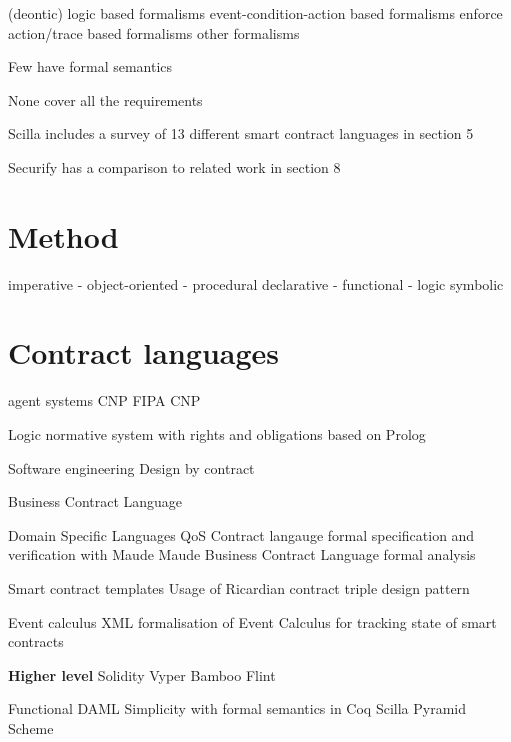 \documentclass{article}
\begin{document}
(deontic) logic based formalisms
event-condition-action based formalisms enforce
action/trace based formalisms
other formalisms

Few have formal semantics \cite{Andersen2006} \cite{Kyas2008} \cite{Xu2004}

None cover all the requirements


Scilla includes a survey of 13 different smart contract languages in section 5 \cite{Sergey2018}

Securify has a comparison to related work in section 8 \cite{Tsankov2017}



\section{Method}
\label{method}

imperative
- object-oriented
- procedural
declarative
- functional
- logic
symbolic



\section{Contract languages}
\label{languages}

agent systems
CNP \cite{Smith1980}
FIPA CNP \cite{FIPA2002}

Logic
normative system with rights and obligations based on Prolog \cite{Michael2010}


Software engineering
Design by contract \cite{Meyer1992}

Business Contract Language \cite{Neal.2003}

Domain Specific Languages
QoS Contract langauge formal specification and verification with Maude \cite{Braga2009} Maude \cite{Clavel2007}
Business Contract Language formal analysis \cite{Governatori2006}


Smart contract templates
Usage of Ricardian contract triple design pattern \cite{Clack2016}


Event calculus
XML formalisation of Event Calculus for tracking state of smart contracts \cite{Farrell2004}

\textbf{Higher level}
Solidity \cite{Ethereum2018Solidity}
Vyper \cite{Ethereum2018Vyper}
Bamboo \cite{Hirai2018Bamboo}
Flint \cite{Schrans2018}


Functional
DAML \cite{Shaul2018,Meier2018,Lippmeier2018,Huschenbett2018,Bernauer2018,Maric2018,Bleikertz2018,Lochbihler2018,Pilav2018}
Simplicity \cite{OConnor2017} with formal semantics in Coq
Scilla \cite{Sergey2018}
Pyramid Scheme \cite{Burge2018}
\end{document}
